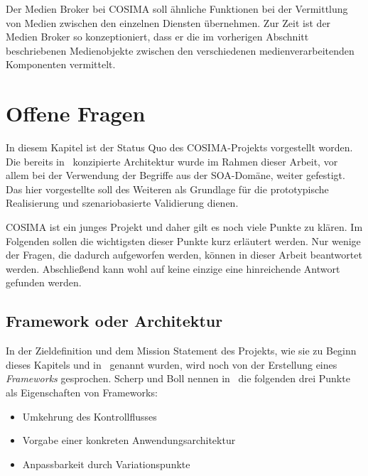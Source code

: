   Der Medien Broker bei COSIMA soll ähnliche Funktionen bei der Vermittlung von Medien zwischen den einzelnen Diensten übernehmen. Zur Zeit ist der Medien Broker so konzeptioniert, dass er die im vorherigen Abschnitt beschriebenen Medienobjekte zwischen den verschiedenen medienverarbeitenden Komponenten vermittelt.



\section{Offene Fragen} %
\label{sec:offene_fragen}

  In diesem Kapitel ist der Status Quo des COSIMA-Projekts vorgestellt worden. Die bereits in~\citep{bericht} konzipierte Architektur wurde im Rahmen dieser Arbeit, vor allem bei der Verwendung der Begriffe aus der SOA-Domäne, weiter gefestigt. Das hier vorgestellte soll des Weiteren als Grundlage für die prototypische Realisierung und szenariobasierte Validierung dienen.

  COSIMA ist ein junges Projekt und daher gilt es noch viele Punkte zu klären. Im Folgenden sollen die wichtigsten dieser Punkte kurz erläutert werden. Nur wenige der Fragen, die dadurch aufgeworfen werden, können in dieser Arbeit beantwortet werden. Abschließend kann wohl auf keine einzige eine hinreichende Antwort gefunden werden.
  
\subsection{Framework oder Architektur} %
\label{sub:framework_oder_architektur}

  In der Zieldefinition und dem Mission Statement des Projekts, wie sie zu Beginn dieses Kapitels und in~\citep{bericht} genannt wurden, wird noch von der Erstellung eines \emph{Frameworks} gesprochen. Scherp und Boll nennen in~\citep[S. 396f]{scherp2006fe} die folgenden drei Punkte als Eigenschaften von Frameworks:
  
  \begin{itemize}
    \item Umkehrung des Kontrollflusses
    \item Vorgabe einer konkreten Anwendungsarchitektur
    \item Anpassbarkeit durch Variationspunkte
  \end{itemize}
  
